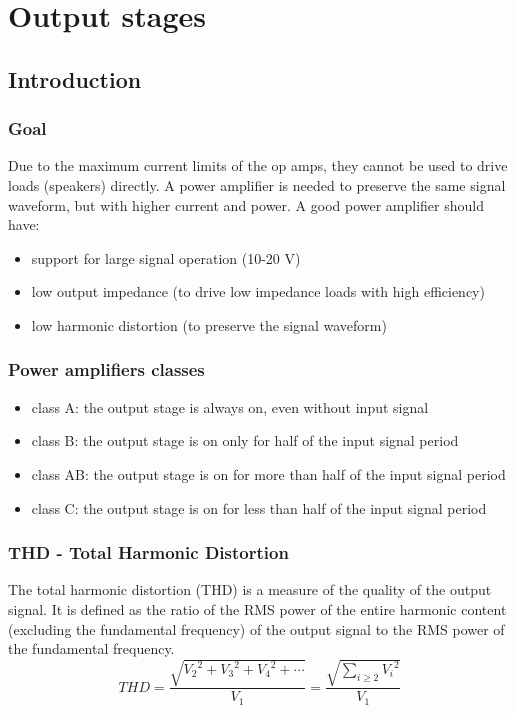 \section{Output stages}
\subsection{Introduction}
\subsubsection*{Goal}
Due to the maximum current limits of the op amps, they cannot be used to drive loads (speakers) directly. A power amplifier is
needed to preserve the same signal waveform, but with higher current and power. A good power amplifier should have:
\begin{itemize}
	\item support for large signal operation (10-20 V)
	\item low output impedance (to drive low impedance loads with high efficiency)
	\item low harmonic distortion (to preserve the signal waveform)
\end{itemize}

\subsubsection*{Power amplifiers classes}
\begin{itemize}
	\item class A: the output stage is always on, even without input signal
	\item class B: the output stage is on only for half of the input signal period
	\item class AB: the output stage is on for more than half of the input signal period
	\item class C: the output stage is on for less than half of the input signal period
\end{itemize}

\subsubsection*{THD - Total Harmonic Distortion}
The total harmonic distortion (THD) is a measure of the quality of the output signal. It is defined as the ratio of the RMS power
of the entire harmonic content (excluding the fundamental frequency) of the output signal to the RMS power of the fundamental
frequency.
\[THD = \frac{\sqrt{{V_2}^2 + {V_3}^2 + {V_4}^2 + \cdots}}{V_1} = \frac{\sqrt{\sum_{i \geq 2} {V_i}^2}}{V_1}\]

